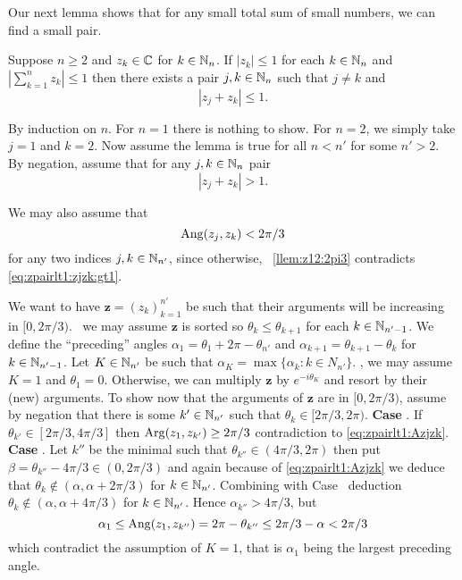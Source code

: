 Our next lemma shows that for any small total sum of small numbers,
we can find a small pair.
\begin{llem} \label{llem:zpairlt1}
Suppose  \(n\geq 2\) and \(z_k\in\mathbb{C}\) for \(k\in\mathbb{N}_n\).
If \(|z_k| \leq 1\) for each \(k\in \mathbb{N}_n\) and 
\(|\sum_{k=1}^n z_k| \leq 1\)
then there exists a pair \(j,k\in\mathbb{N}_n\) such that \(j\neq k\)
and 
\begin{equation} \label{eq:zpairlt1}
|z_j + z_k| \leq 1.
\end{equation}
\end{llem}
\begin{thmproof}
By induction on $n$. For \(n=1\) there is nothing to show.
For \(n=2\), we simply take \(j=1\) and \(k=2\).
Now assume the lemma is true for all \(n<n'\) for some \(n'>2\).
By negation, assume that for any \(j,k\in\mathbb{N}_n\) pair 
\begin{equation} \label{eq:zpairlt1:zjzk:gt1}
|z_j + z_k| > 1.
\end{equation}

We may also assume that 
\begin{equation} \label{eq:zpairlt1:Azjzk}
\mathop{\rm Ang}\nolimits(z_j,z_k) < 2\pi/3
\end{equation}
for any two indices \(j,k\in\mathbb{N}_{n'}\), since otherwise,
\loclemma~\ref{llem:z12:2pi3} contradicts \eqref{eq:zpairlt1:zjzk:gt1}.

We want to have \(\mathbf{z} = (z_k)_{k=1}^{n'}\) be such that 
their arguments will be increasing in \([0,2\pi/3)\).
\Wlogy\ we may assume 
\(\mathbf{z}\) is sorted so \(\theta_k \leq \theta_{k+1}\)
for each \(k\in\mathbb{N}_{n'-1}\). 
We define the ``preceding'' angles
\(\alpha_1 = \theta_1 + 2\pi - \theta_{n'}\) 
and
\(\alpha_{k+1} = \theta_{k+1} - \theta_k\) for \(k\in\mathbb{N}_{n'-1}\).
Let \(K\in\mathbb{N}_{n'}\) be such that \(\alpha_K = \max\{\alpha_k:k\in N_{n'}\}\).
\Wlogy, we may assume \(K=1\) and \(\theta_1 = 0\). Otherwise, 
we can multiply \(\mathbf{z}\) by \(e^{-i\theta_K}\) and resort by
their (new) arguments.
To show now that the arguments of \(\mathbf{z}\) are in \([0,2\pi/3)\),
assume by negation that there is some \(k'\in\mathbb{N}_{n'}\) such that
\(\theta_k \in [2\pi/3,2\pi)\).
\newline
\textbf{Case }.
If \(\theta_{k'}\in [2\pi/3,4\pi/3]\) then \(\mathop{\rm Arg}\nolimits(z_1,z_{k'})\geq 2\pi/3\)
contradiction to \eqref{eq:zpairlt1:Azjzk}.
\newline
\textbf{Case }.
Let \(k''\) be the minimal such that
\(\theta_{k''}\in (4\pi/3,2\pi)\) then put 
\(\beta = \theta_{k''} - 4\pi/3 \in (0,2\pi/3)\) and 
again because of \eqref{eq:zpairlt1:Azjzk} we deduce that
\(\theta_k \notin (\alpha, \alpha + 2\pi/3)\) 
for \(k\in\mathbb{N}_{n'}\).
Combining with Case~ deduction
\(\theta_k \notin (\alpha, \alpha + 4\pi/3)\)
for \(k\in\mathbb{N}_{n'}\). 
Hence \(\alpha_{k''} > 4\pi/3\), but
\begin{equation*}
\alpha_1 \leq \mathop{\rm Ang}\nolimits(z_1,z_{k''}) = 2\pi - \theta_{k''} 
 \leq 2\pi/3 - \alpha < 2\pi/3
\end{equation*}
which contradict the assumption of 
\(K=1\), that is \(\alpha_1\) being the largest preceding angle.


\end{thmproof}
